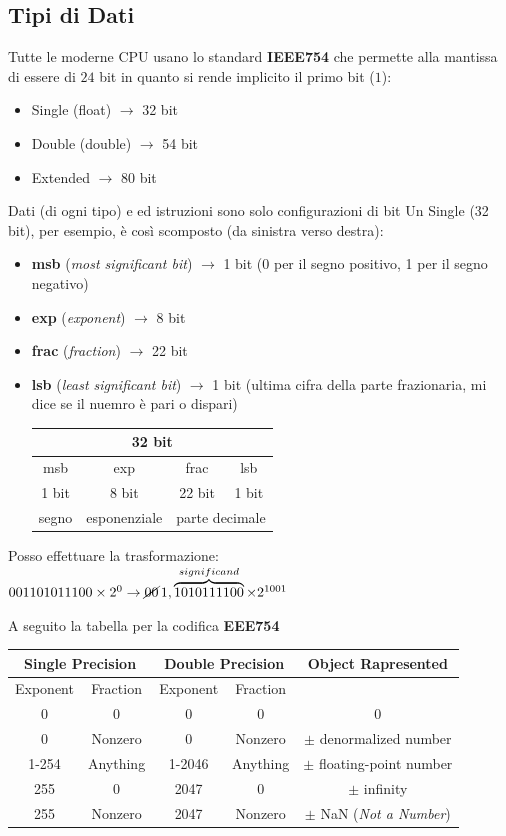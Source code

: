\documentclass[a4paper,12pt, oneside]{book}
\begin{document}
\subsection{Tipi di Dati}
Tutte le moderne CPU usano lo standard \textbf{IEEE754} che permette alla mantissa di essere di $24$ bit  in quanto si rende implicito il primo bit ($1$):
\begin{itemize}
\item Single (float) $\rightarrow$ 32 bit
\item Double (double) $\rightarrow$ 54 bit
\item Extended $\rightarrow$ 80 bit
\end{itemize}
Dati (di ogni tipo) e ed istruzioni sono solo configurazioni di bit
Un Single (32 bit), per esempio, è così scomposto (da sinistra verso destra):
\begin{itemize}
\item \textbf{msb} (\textit{most significant bit}) $\rightarrow$ 1 bit (0 per il segno positivo, 1 per il segno negativo)
\item \textbf{exp} (\textit{exponent}) $\rightarrow$ 8 bit
\item \textbf{frac} (\textit{fraction}) $\rightarrow$ 22 bit
\item \textbf{lsb} (\textit{least significant bit}) $\rightarrow$ 1 bit (ultima cifra della parte frazionaria, mi dice se il nuemro è pari o dispari)
\begin{center}
\begin{tabular}{c|c|c|c}
\multicolumn{4}{c}{32 bit}\\ \hline
msb&exp&frac&lsb\\ \hline
1 bit & 8 bit & 22 bit & 1 bit\\ \hline
segno & esponenziale & \multicolumn{2}{c}{parte decimale}\\ \hline
\end{tabular}
\end{center}
\end{itemize}
\begin{esempio}[???]
Posso effettuare la trasformazione:\\
$001101011100\times 2^0\rightarrow \cancel{00}\,1,\overbrace{1010111100}^{significand}\times 2^{1001}$
\end{esempio}
A seguito la tabella per la codifica \textbf{EEE754}
\begin{center}
\begin{tabular}{c|c|c|c|c}
\multicolumn{2}{c}{Single Precision} & \multicolumn{2}{c}{Double Precision} & Object Rapresented\\ \hline
Exponent&Fraction&Exponent&Fraction\\ \hline
0&0&0&0&0\\ \hline
0&Nonzero&0&Nonzero&$\pm$ denormalized number\\ \hline
1-254&Anything&1-2046&Anything&$\pm$ floating-point number\\ \hline
255&0&2047&0&$\pm$ infinity\\ \hline
255&Nonzero&2047&Nonzero&$\pm$ NaN (\textit{Not a Number})\\ \hline
\end{tabular}
\end{center}
\end{document}
